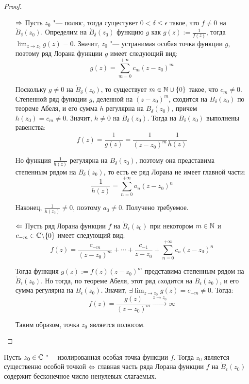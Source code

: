 \begin{proof}~
	\begin{itemize}
		\item[$\Rightarrow$]Пусть $z_0$ "--- полюс, тогда сущестувет $0 < \delta \le \epsilon$ такое, что $f \ne 0$ на $\mathring B_\delta(z_0)$. Определим на $\mathring B_\delta(z_0)$ функцию $g$ как $g(z) := \frac1{f(z)}$, тогда $\lim_{z \to z_0}g(z) = 0$. Значит, $z_0$ "--- устранимая особая точка функции $g$, поэтому ряд Лорана функции $g$ имеет следующий вид:
		\[g(z) = \sum_{m = 0}^{+\infty}c_m(z - z_0)^m\]
		
		Поскольку $g \ne 0$ на $\mathring B_\delta(z_0)$, то существует $m \in \mathbb{N} \cup \{0\}$ такое, что $c_m \ne 0$. \pagebreak Степенной ряд функции ${g}$, деленной на ${(z - z_0)^m}$, сходится на $B_\delta(z_0)$ по теореме Абеля, и его сумма $h$ регулярна на $B_\delta(z_0)$, причем $h(z_0) = c_m \ne 0$. Значит, $h \ne 0$ на $B_\delta(z_0)$. Тогда на $\mathring B_\delta(z_0)$ выполнены равенства:
		\[f(z) = \frac{1}{g(z)} = \frac1{(z - z_0)^m}\frac1{h(z)}\]
		
		Но функция $\frac1{h(z)}$ регулярна на $B_\delta(z_0)$, поэтому она представима степенным рядом на $B_\delta(z_0)$, то есть ее ряд Лорана не имеет главной части:
		\[\frac{1}{h(z)} = \sum_{n=0}^{+\infty}a_n(z - z_0)^n\]
		
		Наконец, $\frac1{h(z_0)} \ne 0$, поэтому $a_0 \ne 0$. Получено требуемое.
		
		\item[$\Leftarrow$] Пусть ряд Лорана функции $f$ на $\mathring B_\epsilon(z_0)$ при некотором $m \in \mathbb{N}$ и $c_{-m} \in \mathbb{C} \backslash \{0\}$ имеет следующий вид:
		\[f(z) = \frac{c_{-m}}{(z-z_0)^m} + \dotsb + \frac{c_{-1}}{z-z_0} + \sum_{n = 0}^{+\infty}c_n(z - z_0)^n\]
		
		Тогда функция $g(z) := f(z)(z-z_0)^m$ представима степенным рядом на $\mathring B_\epsilon(z_0)$. Но тогда, по теореме Абеля, этот ряд cходится на $B_\epsilon(z_0)$, и его сумма регулярна на $B_\epsilon(z_0)$. Значит, $\exists\lim_{z \to z_0} g(z) = c_{-m} \ne 0$. Тогда:
		\[f(z) = \frac{g(z)}{(z - z_0)^m} \xrightarrow{z \to z_0} \infty\]
		
		Таким образом, точка $z_0$ является полюсом.\qedhere
	\end{itemize}
\end{proof}

\begin{corollary}
	Пусть $z_0 \in \mathbb{C}$ "--- изолированная особая точка функции $f$. Тогда $z_0$ является существенно особой точкой $\Leftrightarrow$ главная часть ряда Лорана функции $f$ на $\mathring B_\epsilon(z_0)$ содержит бесконечное число ненулевых слагаемых.
\end{corollary}

